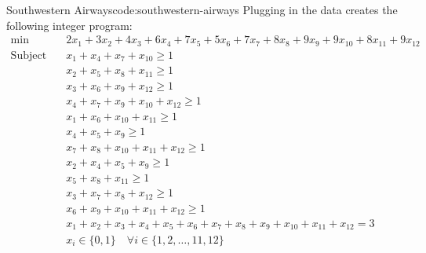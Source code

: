 \begin{examplewithcode}{Southwestern Airways\footnotemark}{code:southwestern-airways}
Plugging in the data creates the following integer program:
\begin{align*}\min\quad & 2 x_{1} + 3 x_{2} + 4 x_{3} + 6 x_{4} + 7 x_{5} + 5 x_{6} + 7 x_{7} + 8 x_{8} + 9 x_{9} + 9 x_{10} + 8 x_{11} + 9 x_{12}\\
\text{Subject to} \quad & x_{1} + x_{4} + x_{7} + x_{10} \geq 1\\
 & x_{2} + x_{5} + x_{8} + x_{11} \geq 1\\
 & x_{3} + x_{6} + x_{9} + x_{12} \geq 1\\
 & x_{4} + x_{7} + x_{9} + x_{10} + x_{12} \geq 1\\
 & x_{1} + x_{6} + x_{10} + x_{11} \geq 1\\
 & x_{4} + x_{5} + x_{9} \geq 1\\
 & x_{7} + x_{8} + x_{10} + x_{11} + x_{12} \geq 1\\
 & x_{2} + x_{4} + x_{5} + x_{9} \geq 1\\
 & x_{5} + x_{8} + x_{11} \geq 1\\
 & x_{3} + x_{7} + x_{8} + x_{12} \geq 1\\
 & x_{6} + x_{9} + x_{10} + x_{11} + x_{12} \geq 1\\
 & x_{1} + x_{2} + x_{3} + x_{4} + x_{5} + x_{6} + x_{7} + x_{8} + x_{9} + x_{10} + x_{11} + x_{12} = 3\\
 & x_{i} \in \{0,1\} \quad\forall i \in \{1,2,\dots,11,12\}\\
\end{align*}

\end{examplewithcode}






